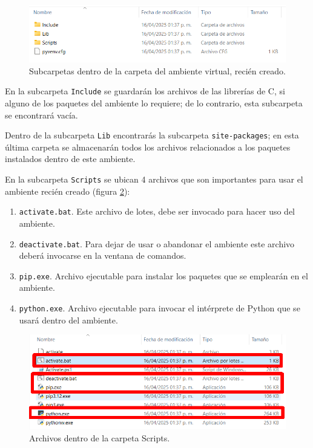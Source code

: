 \documentclass{article}
\begin{document}
	\begin{figure}[H]
		\centering
		\includegraphics[width=0.8\linewidth]{Figura06}
		\caption{Subcarpetas dentro de la carpeta del ambiente virtual, recién creado.}
		\label{fig:figura06}
	\end{figure}
	
	En la subcarpeta \texttt{Include} se guardarán los archivos de las librerías de C, si alguno de los paquetes del ambiente lo requiere; de lo contrario, esta subcarpeta se encontrará vacía.\bigskip
	
	Dentro de la subcarpeta \texttt{Lib} encontrarás la subcarpeta \texttt{site-packages}; en esta última carpeta se almacenarán todos los archivos relacionados a los paquetes instalados dentro de este ambiente.\bigskip
	
	En la subcarpeta \texttt{Scripts} se ubican 4 archivos que son importantes para usar el ambiente recién creado (figura \ref{fig:figura07}):
	\begin{enumerate}\label{listref}
		\item \texttt{activate.bat}. Este archivo de lotes, debe ser invocado para hacer uso del ambiente.
		\item \texttt{deactivate.bat}. Para dejar de usar o abandonar el ambiente este archivo deberá invocarse en la ventana de comandos.
		\item \texttt{pip.exe}. Archivo ejecutable para instalar los paquetes que se emplearán en el ambiente.
		\item \texttt{python.exe}. Archivo ejecutable para invocar el intérprete de Python que se usará dentro del ambiente.
	\end{enumerate}
	
	\begin{figure}[H]
		\centering
		\includegraphics[width=0.8\linewidth]{Figura07}
		\caption{Archivos dentro de la carpeta Scripts.}
		\label{fig:figura07}
	\end{figure}
	
\end{document}
